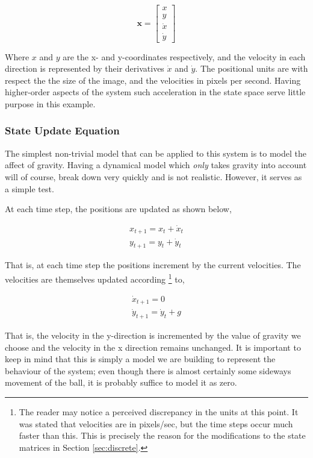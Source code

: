 \begin{equation}\label{eq:basket-state-space}
\mathbf{x} =
\begin{bmatrix}
x \\ y \\ \dot{x} \\ \dot{y}
\end{bmatrix}
\end{equation}

Where $x$ and $y$ are the x- and y-coordinates respectively, and the velocity
in each direction is represented by their derivatives $\dot{x}$ and $\dot{y}$.
The positional units are with respect the the size of the image, and the velocities
in pixels per second. Having higher-order aspects of the system such acceleration
in the state space serve little purpose in this example.

\subsubsection{State Update Equation}
The simplest non-trivial model that can be applied to this system is to model
the affect of gravity. Having a dynamical model which \emph{only} takes gravity
into account will of course, break down very quickly and is not realistic. However,
it serves as a simple test.

At each time step, the positions are updated as shown below,

\begin{align}
x_{t+1} = x_{t} + \dot{x}_{t} \\
y_{t+1} = y_{t} + \dot{y}_{t}
\end{align}

That is, at each time step the positions increment by the current velocities.
The velocities are themselves updated according
\footnote{The reader may notice a
perceived discrepancy in the units
at this point. It was stated that velocities are in pixels/sec, but the time
steps occur much faster than this. This is precisely the reason for the
modifications to the state matrices in Section \ref{sec:discrete}.
}
to,

\begin{align}
\dot{x}_{t+1} = 0 \\
\dot{y}_{t+1} = \dot{y}_{t} + g
\end{align}

That is, the velocity in the y-direction is incremented by the value of gravity
we choose and the velocity in the x direction remains unchanged.
It is important to keep in mind that this is simply a model we are building to
represent the behaviour of the
system; even though there is almost certainly some sideways movement of the ball,
it is probably suffice to model it as zero.


